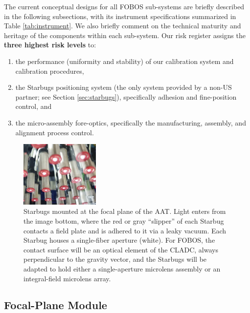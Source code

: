 \documentclass[oneside,11pt]{amsart}
\begin{document}

The current conceptual designs for all FOBOS sub-systems are briefly
described in the following subsections, with its instrument
specifications summarized in Table \ref{tab:instrument}. We also
briefly comment on the technical maturity and heritage of the
components within each sub-system. Our risk register assigns the
{\bf three highest risk levels} to:
%
\begin{enumerate}
\item the performance (uniformity and stability) of our calibration
system and calibration procedures,
\item the Starbugs positioning system (the only system provided by a
non-US partner; see Section \ref{sec:starbugs}), specifically
adhesion and fine-position control, and
\item the micro-assembly fore-optics, specifically the manufacturing,
assembly, and alignment process control.
\end{enumerate}

\begin{figure}
\small
\includegraphics[width=0.35\textwidth]{starbugs_v1.jpg}
\caption{Starbugs mounted at the focal plane of the AAT. Light
enters from the image bottom, where the red or gray
``slipper'' of each Starbug contacts a field plate and is adhered to
it via a leaky vacuum. Each Starbug houses
a single-fiber aperture (white). For FOBOS, the contact surface will be
an optical element of the CLADC, always perpendicular to the
gravity vector, and the Starbugs will be adapted to hold either a
single-aperture microlens assembly or an integral-field microlens
array.}
\label{fig:org}
\end{figure}

\subsection{Focal-Plane Module}
\end{document}
